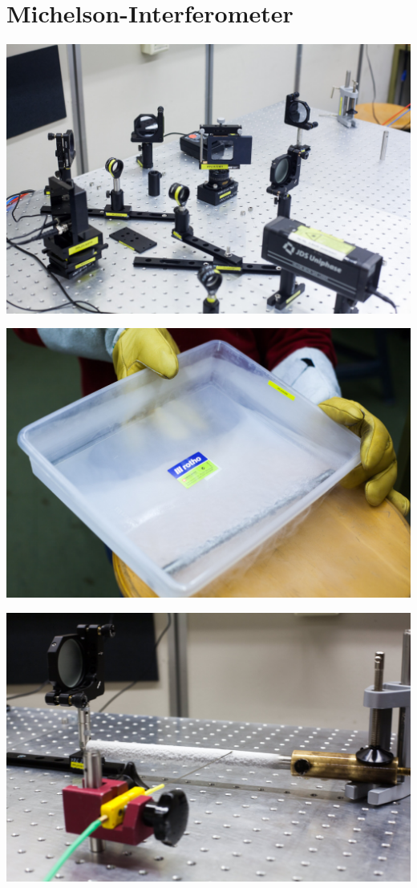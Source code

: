 \documentclass[11pt]{beamer}
\begin{document}
\section{Michelson-Interferometer}
\begin{frame}
	\includegraphics[width=\textwidth]{images/2/interferrometer-4}
\end{frame}
\begin{frame}
	\includegraphics[width=\textwidth]{images/2/interferrometer-1}
\end{frame}
\begin{frame}
	\includegraphics[width=\textwidth]{images/2/interferrometer-2}
\end{frame}
\end{document}
